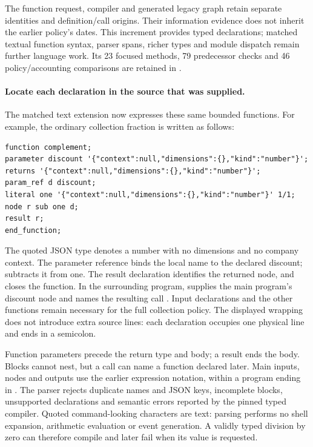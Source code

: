 The function request, compiler and generated legacy graph retain separate
identities and definition/call origins. Their information evidence does not
inherit the earlier policy's dates. This increment provides typed declarations;
matched textual function syntax, parser spans, richer types and module dispatch
remain further language work. Its 23 focused methods, 79 predecessor checks
and 46 policy/accounting comparisons are retained in
.


\paragraph{Locate each declaration in the source that was supplied.}
The matched text extension now expresses these same bounded functions. For
example, the ordinary collection fraction is written as follows:
\begin{lstlisting}[basicstyle=\ttfamily\scriptsize,breaklines=true]
function complement;
parameter discount '{"context":null,"dimensions":{},"kind":"number"}';
returns '{"context":null,"dimensions":{},"kind":"number"}';
param_ref d discount;
literal one '{"context":null,"dimensions":{},"kind":"number"}' 1/1;
node r sub one d;
result r;
end_function;
\end{lstlisting}
The quoted JSON type denotes a number with no dimensions and no company
context. The parameter reference binds the local name  to the declared
discount;  subtracts it from one. The result declaration identifies
the returned node, and  closes the function. In the
surrounding program,  supplies the
main program's discount node and names the resulting call .
Input declarations and the other functions remain necessary for the full
collection policy. The displayed wrapping does not introduce extra source
lines: each declaration occupies one physical line and ends in a semicolon.

Function parameters precede the return type and body; a result ends the body.
Blocks cannot nest, but a call can name a function declared later. Main inputs,
nodes and outputs use the earlier expression notation, within a
 program ending in .
The parser rejects duplicate names and JSON keys, incomplete blocks, unsupported
declarations and semantic errors reported by the pinned typed compiler.
Quoted command-looking characters are text: parsing performs no shell
expansion, arithmetic evaluation or event generation. A validly typed division
by zero can therefore compile and later fail when its value is requested.

